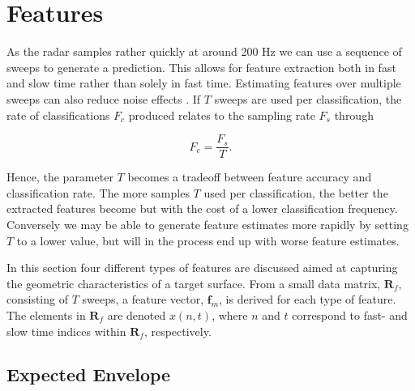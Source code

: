 \section{Features}

As the radar samples rather quickly at around 200 Hz we can use a sequence of sweeps to generate a prediction. This allows for feature extraction both in fast and slow time rather than solely in fast time. Estimating features over multiple sweeps can also reduce noise effects \citep{w_doerry_2016}. If $T$ sweeps are used per classification, the rate of classifications $F_c$ produced relates to the sampling rate $F_s$ through

\begin{equation}
	\label{eq:classification_rate}
	F_c = \frac{F_s}{T}.
\end{equation} 

Hence, the parameter $T$ becomes a tradeoff between feature accuracy and classification rate. The more samples $T$ used per classification, the better the extracted features become but with the cost of a lower classification frequency. Conversely we may be able to generate feature estimates more rapidly by setting $T$ to a lower value, but will in the process end up with worse feature estimates. 


In this section four different types of features are discussed aimed at capturing the geometric characteristics of a target surface. From a small data matrix, $\mathbf{R}_f$, consisting of $T$ sweeps, a feature vector, $\mathbf{f}_m$, is derived for each type of feature. The elements in $\mathbf{R}_f$ are denoted $x(n,t)$, where $n$ and $t$ correspond to fast- and slow time indices within $\mathbf{R}_f$, respectively.


\subsection{Expected Envelope}

